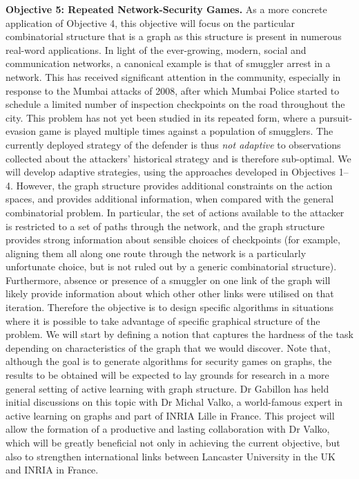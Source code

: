 \textbf{Objective 5:  Repeated Network-Security Games.}
As a more concrete application of Objective 4, this objective will focus on the particular combinatorial structure that is a graph as this structure is present in  numerous real-word applications.
In light of the ever-growing, modern, social and communication networks, a canonical example is that of smuggler arrest in a network\cite{jain2011double}. This has received significant attention in the community, especially in  response  to  the  Mumbai  attacks  of  2008, after which  Mumbai  Police
started to schedule a limited number of inspection checkpoints
on the road throughout the city.
This problem has not yet been studied in its repeated form, where a pursuit-evasion game is played multiple times against a population of smugglers. The currently deployed strategy of the defender is thus \textit{not adaptive} to observations collected about the attackers' historical strategy and is therefore sub-optimal.  We will develop adaptive strategies, using the approaches developed in Objectives 1--4.  However, the graph structure provides additional constraints on the action spaces, and provides additional information, when compared with the general combinatorial problem.  In particular, the set of actions available to the attacker is restricted to a set of paths through the network, and the graph structure provides strong information about sensible choices of checkpoints (for example, aligning them all along one route through the network is a particularly unfortunate choice, but is not ruled out by a generic combinatorial structure).  Furthermore, absence or presence of a smuggler on one link of the graph will likely provide information about which other other links were utilised on that iteration. Therefore the objective  is to design specific algorithms in situations where it is possible to take advantage of specific graphical structure of the problem. We will start by defining a notion that captures the hardness of the task depending on characteristics of the graph that we would discover. Note that, although the goal is to generate algorithms for security games on graphs, the results to be obtained will be expected to lay grounds for research in a more general setting of active learning with graph structure. Dr Gabillon has held initial discussions on this topic with Dr Michal Valko, a world-famous expert in active learning on graphs and part of INRIA Lille in France. This project will allow the formation of a productive and lasting collaboration with Dr Valko, which will be greatly beneficial not only in achieving the current objective, but also to strengthen international links between Lancaster University in the UK and INRIA in France.  
 
